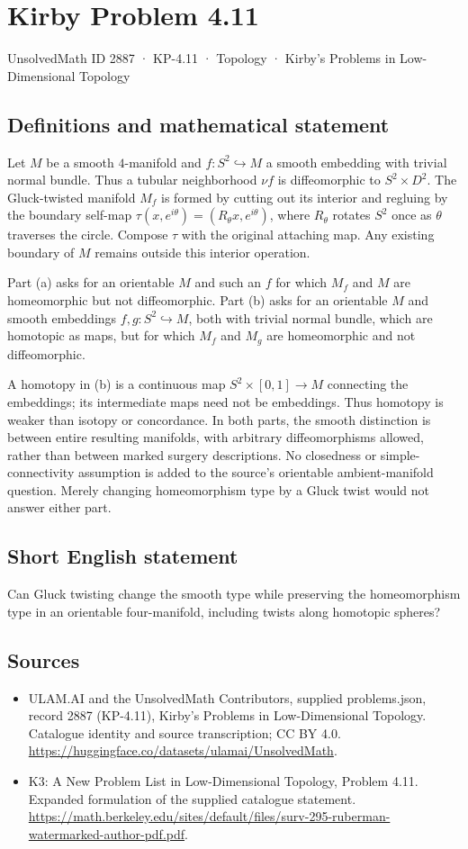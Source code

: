 \documentclass[11pt,a4paper]{article}
\begin{document}
\section*{Kirby Problem 4.11}\label{2887}
{\small UnsolvedMath ID 2887 · KP-4.11 · Topology · Kirby's Problems in Low-Dimensional Topology}
\subsection{Definitions and mathematical statement}
Let $M$ be a smooth $4$-manifold and $f:S^2\hookrightarrow M$ a
smooth embedding with trivial normal bundle. Thus a tubular neighborhood
$\nu f$ is diffeomorphic to $S^2\times D^2$.
The Gluck-twisted manifold $M_f$ is formed by cutting out its interior
and regluing by the boundary self-map
$\tau(x,e^{i\theta})=(R_\theta x,e^{i\theta})$, where $R_\theta$
rotates $S^2$ once as $\theta$ traverses the circle. Compose $\tau$
with the original attaching map. Any existing boundary of $M$ remains
outside this interior operation.

Part (a) asks for an orientable $M$ and such an $f$ for which $M_f$
and $M$ are homeomorphic but not diffeomorphic.
Part (b) asks for an orientable $M$ and smooth embeddings
$f,g:S^2\hookrightarrow M$, both with trivial normal bundle, which
are homotopic as maps, but for which $M_f$ and $M_g$ are homeomorphic
and not diffeomorphic.

A homotopy in (b) is a continuous map $S^2\times[0,1]\to M$ connecting
the embeddings; its intermediate maps need not be embeddings. Thus
homotopy is weaker than isotopy or concordance. In both parts, the
smooth distinction is between entire resulting manifolds, with arbitrary
diffeomorphisms allowed, rather than between marked surgery descriptions.
No closedness or simple-connectivity assumption is added to the source's
orientable ambient-manifold question. Merely changing homeomorphism type
by a Gluck twist would not answer either part.
\subsection{Short English statement}
Can Gluck twisting change the smooth type while preserving the homeomorphism type in an orientable four-manifold, including twists along homotopic spheres?
\subsection{Sources}
\begin{itemize}
\item[S1] ULAM.AI and the UnsolvedMath Contributors, supplied problems.json, record 2887 (KP-4.11), Kirby's Problems in Low-Dimensional Topology. Catalogue identity and source transcription; CC BY 4.0.
\url{https://huggingface.co/datasets/ulamai/UnsolvedMath}.
\item[S2] K3: A New Problem List in Low-Dimensional Topology, Problem 4.11. Expanded formulation of the supplied catalogue statement.
\url{https://math.berkeley.edu/sites/default/files/surv-295-ruberman-watermarked-author-pdf.pdf}.
\end{itemize}
\end{document}
